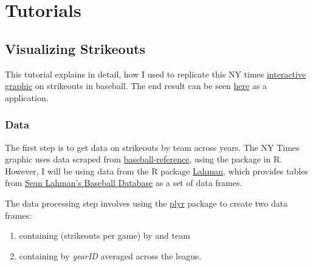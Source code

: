 \documentclass[letterpaper,10pt,english]{sphinxmanual}
\begin{document}


\chapter{Tutorials}
\label{tutorials/index::doc}\label{tutorials/index:id1}\label{tutorials/index:tutorials}

\section{Visualizing Strikeouts}
\label{tutorials/nytinteractive:nytinteractive}\label{tutorials/nytinteractive::doc}\label{tutorials/nytinteractive:visualizing-strikeouts}
This tutorial explains in detail, how I used  to replicate this NY times \href{http://www.nytimes.com/interactive/2013/03/29/sports/baseball/Strikeouts-Are-Still-Soaring.html?ref=baseball}{interactive graphic} on strikeouts in baseball. The end result can be seen \href{http://glimmer.rstudio.com/ramnathv/strikeouts}{here} as a  application.


\subsection{Data}
\label{tutorials/nytinteractive:data}
The first step is to get data on strikeouts by team across years. The NY Times graphic uses data scraped from \href{http://www.baseball-reference.com/}{baseball-reference}, using the  package in R. However, I will be using data from the R package \href{http://cran.r-project.org/web/packages/Lahman/index.html}{Lahman}, which provides tables from \href{http://www.seanlahman.com/baseball-archive/statistics/}{Sean Lahman's Baseball Database} as a set of data frames.

The data processing step involves using the \href{http://cran.r-project.org/web/packages/plyr/index.html}{plyr} package to create two data frames:
\begin{enumerate}
\item {} 
 containing  (strikeouts per game) by  and team 

\item {} 
 containing  by \emph{yearID} averaged across the league.

\end{enumerate}
\end{document}
